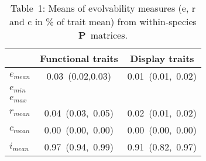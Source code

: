 \documentclass[12pt,letterpaper]{article}
\def\PC{\emph{P.~cranolopha}}
\def\PM{{\bf P}}
\begin{document}
\begin{table}
\caption*{Table~1: Means of evolvability measures (e, r and c in \% of trait mean) from within-species \PM~matrices.} 
\centering
\small
\begin{tabular}{lcc}
\hline
              &  Functional traits     &   Display traits        \\
\hline
$e_{mean}$      &   0.03~(0.02,0.03)     &   0.01~(0.01,~0.02)     \\
$e_{min}$       &                        &   \\
$e_{max}$       &                        &       \\
$r_{mean}$      &   0.04~(0.03,~0.05)    &   0.02~(0.01,~0.02)    \\
$c_{mean}$      &   0.00~(0.00,~0.00)    &   0.00~(0.00,~0.00)    \\
$i_{mean}$      &   0.97~(0.94,~0.99)    &   0.91~(0.82,~0.97)    \\
\hline
\end{tabular}
\end{table}




\end{document}
